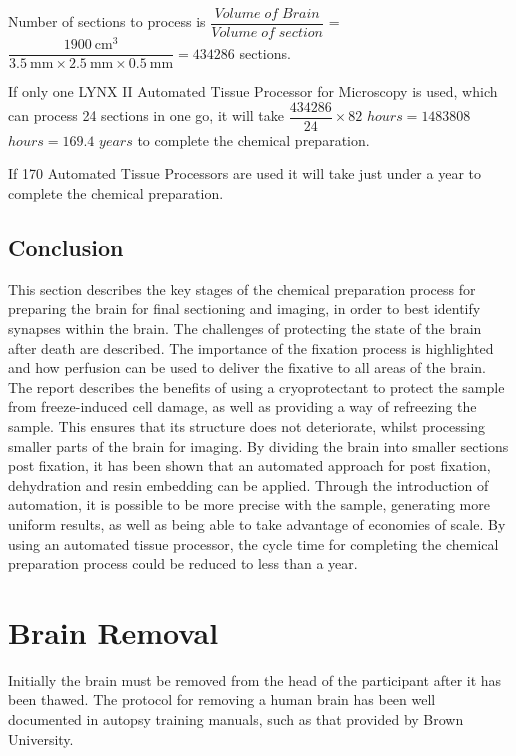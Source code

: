 \documentclass[a4paper, 11pt]{article}
\numberwithin{equation}{section}
\begin{document}
Number of sections to process is $\dfrac{Volume\;  of\;  Brain}{Volume\; of\;  section}$ = $\dfrac{\SI{1900}{\centi\meter\cubed} }{\SI{3.5}{\milli\meter} \times \SI{2.5}{\milli\meter} \times \SI{0.5}{\milli\meter}} = 434286$ sections. 

If only one LYNX II Automated Tissue Processor for Microscopy is used, which can process 24 sections in one go, it will take $\dfrac{434286}{24}\times 82$ $hours = 1483808$ $hours = 169.4$ $years$ to complete the chemical preparation. 

If 170 Automated Tissue Processors are used it will take just under a year to complete the chemical preparation. 


\subsection{Conclusion}

This section describes the key stages of the chemical preparation process for preparing the brain for final sectioning and imaging, in order to best identify synapses within the brain. The challenges of protecting the state of the brain after death are described. The importance of the fixation process is highlighted and how perfusion can be used to deliver the fixative to all areas of the brain. The report describes the benefits of using a cryoprotectant to protect the sample from freeze-induced cell damage, as well as providing a way of refreezing the sample. This ensures that its structure does not deteriorate, whilst processing smaller parts of the brain for imaging. By dividing the brain into smaller sections post fixation, it has been shown that an automated approach for post fixation, dehydration and resin embedding can be applied. Through the introduction of automation, it is possible to be more precise with the sample, generating more uniform results, as well as being able to take advantage of economies of scale. By using an automated tissue processor, the cycle time for completing the chemical preparation process could be reduced to less than a year. 

\newpage

\clearpage

\pagestyle{judah}


	\section{Brain Removal}
	\label{brain_removal}
	Initially the brain must be removed from the head of the participant after it has been thawed. The protocol for removing a human brain has been well documented in autopsy training manuals, such as that provided by Brown University.
	
\end{document}
